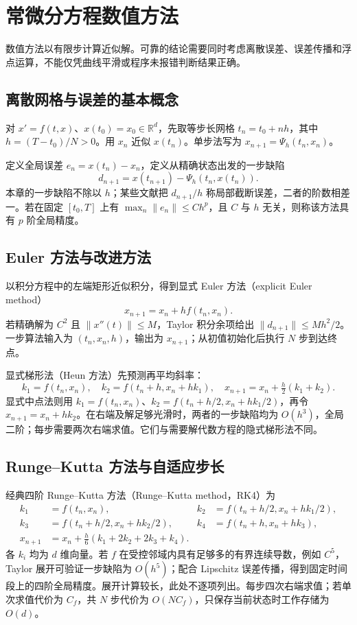 \setcounter{chapter}{12} %
\chapter{常微分方程数值方法}
\label{chap:ode-numerical}

数值方法以有限步计算近似解。可靠的结论需要同时考虑离散误差、误差传播和浮点运算，不能仅凭曲线平滑或程序未报错判断结果正确。

\section{离散网格与误差的基本概念}
对 $x'=f(t,x)$、$x(t_0)=x_0\in\mathbb R^d$，先取等步长网格 $t_n=t_0+nh$，其中 $h=(T-t_0)/N>0$。用 $x_n$ 近似 $x(t_n)$。单步法写为 $x_{n+1}=\Psi_h(t_n,x_n)$。

定义全局误差 $e_n=x(t_n)-x_n$，定义从精确状态出发的一步缺陷
\[
 d_{n+1}=x(t_{n+1})-\Psi_h(t_n,x(t_n)).
\]
本章的一步缺陷不除以 $h$；某些文献把 $d_{n+1}/h$ 称局部截断误差，二者的阶数相差一。若在固定 $[t_0,T]$ 上有 $\max_n\|e_n\|\leq Ch^p$，且 $C$ 与 $h$ 无关，则称该方法具有 $p$ 阶全局精度。

\section{Euler 方法与改进方法}
以积分方程中的左端矩形近似积分，得到显式 Euler 方法（explicit Euler method）
\begin{equation}
 x_{n+1}=x_n+hf(t_n,x_n).
 \label{eq:ode-euler}
\end{equation}
若精确解为 $C^2$ 且 $\|x''(t)\|\leq M$，Taylor 积分余项给出 $\|d_{n+1}\|\leq Mh^2/2$。一步算法输入为 $(t_n,x_n,h)$，输出为 $x_{n+1}$；从初值初始化后执行 $N$ 步到达终点。

显式梯形法（Heun 方法）先预测再平均斜率：
\[
 k_1=f(t_n,x_n),\quad k_2=f(t_n+h,x_n+hk_1),\quad
 x_{n+1}=x_n+\tfrac h2(k_1+k_2).
\]
显式中点法则用 $k_1=f(t_n,x_n)$、$k_2=f(t_n+h/2,x_n+hk_1/2)$，再令 $x_{n+1}=x_n+hk_2$。在右端及解足够光滑时，两者的一步缺陷均为 $O(h^3)$，全局二阶；每步需要两次右端求值。它们与需要解代数方程的隐式梯形法不同。

\section{Runge--Kutta 方法与自适应步长}
经典四阶 Runge--Kutta 方法（Runge--Kutta method，RK4）为
\begin{align*}
 k_1&=f(t_n,x_n),&
 k_2&=f(t_n+h/2,x_n+hk_1/2),\\
 k_3&=f(t_n+h/2,x_n+hk_2/2),&
 k_4&=f(t_n+h,x_n+hk_3),\\
 x_{n+1}&=x_n+\tfrac h6(k_1+2k_2+2k_3+k_4).
\end{align*}
各 $k_i$ 均为 $d$ 维向量。若 $f$ 在受控邻域内具有足够多的有界连续导数，例如 $C^5$，Taylor 展开可验证一步缺陷为 $O(h^5)$；配合 Lipschitz 误差传播，得到固定时间段上的四阶全局精度。展开计算较长，此处不逐项列出。每步四次右端求值；若单次求值代价为 $C_f$，共 $N$ 步代价为 $O(NC_f)$，只保存当前状态时工作存储为 $O(d)$。

